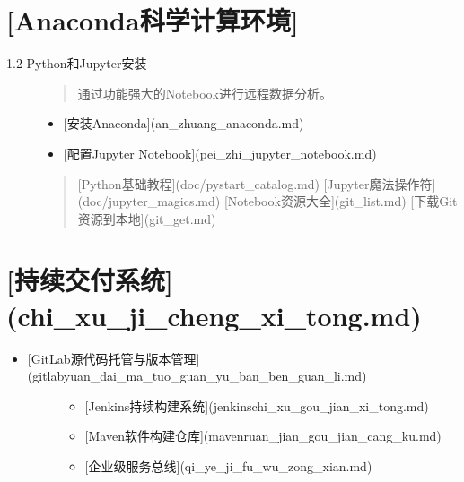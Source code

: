 \documentclass[letterpaper,10pt,english]{sphinxmanual}
\begin{document}
\section{{[}Anaconda科学计算环境{]}}
\label{index:anaconda}\begin{description}
\item[{1.2 Python和Jupyter安装}] \leavevmode\begin{quote}

通过功能强大的Notebook进行远程数据分析。
\end{quote}
\begin{itemize}
\item {} 
{[}安装Anaconda{]}(an\_zhuang\_anaconda.md)

\item {} 
{[}配置Jupyter Notebook{]}(pei\_zhi\_jupyter\_notebook.md)

\end{itemize}
\begin{quote}

{[}Python基础教程{]}(doc/pystart\_catalog.md)
{[}Jupyter魔法操作符{]}(doc/jupyter\_magics.md)
{[}Notebook资源大全{]}(git\_list.md)
{[}下载Git资源到本地{]}(git\_get.md)
\end{quote}

\end{description}


\section{{[}持续交付系统{]}(chi\_xu\_ji\_cheng\_xi\_tong.md)}
\label{index:chi-xu-ji-cheng-xi-tong-md}\begin{itemize}
\item {} \begin{description}
\item[{{[}GitLab源代码托管与版本管理{]}(gitlabyuan\_dai\_ma\_tuo\_guan\_yu\_ban\_ben\_guan\_li.md)}] \leavevmode\begin{itemize}
\item {} 
{[}Jenkins持续构建系统{]}(jenkinschi\_xu\_gou\_jian\_xi\_tong.md)

\item {} 
{[}Maven软件构建仓库{]}(mavenruan\_jian\_gou\_jian\_cang\_ku.md)

\item {} 
{[}企业级服务总线{]}(qi\_ye\_ji\_fu\_wu\_zong\_xian.md)

\end{itemize}

\end{description}

\end{itemize}
\end{document}
